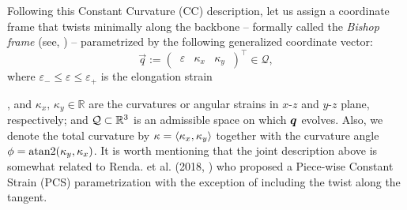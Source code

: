 {\begin{dfn}
\end{dfn}
%
{Following this Constant Curvature (CC) description, let us assign a coordinate frame that twists minimally along the backbone -- formally called the \emph{Bishop frame} (see, \cite{Bishop1975}) -- parametrized by the following generalized coordinate vector:}
%
\begin{equation}
\vec{q} := \begin{pmatrix}
\,\varepsilon & \kappa_x & \kappa_y\,
\end{pmatrix}^\top \in \mathcal{Q},
\label{eq:C2:coordinate}
\end{equation}
%
\noindent where $\varepsilon_{-} \le \varepsilon \le \varepsilon_{+}$ is the elongation strain}, and $\kappa_x,\,\kappa_y\in\mathbb{R}$ are the curvatures or angular strains in $x$-$z$ and $y$-$z$ plane, respectively; and
$\mathcal{Q} \subset \mathbb{R}^3$ is an admissible space on which ${\boldsymbol{q}}$ evolves. Also, we denote the total curvature by $\kappa = \langle {\kappa_x}, {\kappa_y} \rangle$ together with the curvature angle $\phi = \textup{\textrm{atan2}}(\kappa_y,\kappa_x)$. It is worth mentioning that the joint description above is somewhat related to Renda. et al. (2018, \cite{Renda2018}) who proposed a Piece-wise Constant Strain (PCS) parametrization with the exception of including the twist along the tangent.


